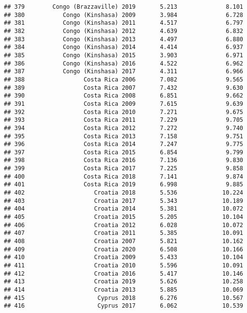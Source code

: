 \documentclass[
]{article}
\begin{document}
\begin{verbatim}
## 379        Congo (Brazzaville) 2019       5.213              8.101
## 380           Congo (Kinshasa) 2009       3.984              6.728
## 381           Congo (Kinshasa) 2011       4.517              6.797
## 382           Congo (Kinshasa) 2012       4.639              6.832
## 383           Congo (Kinshasa) 2013       4.497              6.880
## 384           Congo (Kinshasa) 2014       4.414              6.937
## 385           Congo (Kinshasa) 2015       3.903              6.971
## 386           Congo (Kinshasa) 2016       4.522              6.962
## 387           Congo (Kinshasa) 2017       4.311              6.966
## 388                 Costa Rica 2006       7.082              9.565
## 389                 Costa Rica 2007       7.432              9.630
## 390                 Costa Rica 2008       6.851              9.662
## 391                 Costa Rica 2009       7.615              9.639
## 392                 Costa Rica 2010       7.271              9.675
## 393                 Costa Rica 2011       7.229              9.705
## 394                 Costa Rica 2012       7.272              9.740
## 395                 Costa Rica 2013       7.158              9.751
## 396                 Costa Rica 2014       7.247              9.775
## 397                 Costa Rica 2015       6.854              9.799
## 398                 Costa Rica 2016       7.136              9.830
## 399                 Costa Rica 2017       7.225              9.858
## 400                 Costa Rica 2018       7.141              9.874
## 401                 Costa Rica 2019       6.998              9.885
## 402                    Croatia 2018       5.536             10.224
## 403                    Croatia 2017       5.343             10.189
## 404                    Croatia 2014       5.381             10.072
## 405                    Croatia 2015       5.205             10.104
## 406                    Croatia 2012       6.028             10.072
## 407                    Croatia 2011       5.385             10.091
## 408                    Croatia 2007       5.821             10.162
## 409                    Croatia 2020       6.508             10.166
## 410                    Croatia 2009       5.433             10.104
## 411                    Croatia 2010       5.596             10.091
## 412                    Croatia 2016       5.417             10.146
## 413                    Croatia 2019       5.626             10.258
## 414                    Croatia 2013       5.885             10.069
## 415                     Cyprus 2018       6.276             10.567
## 416                     Cyprus 2017       6.062             10.539

\end{verbatim}
\end{document}
